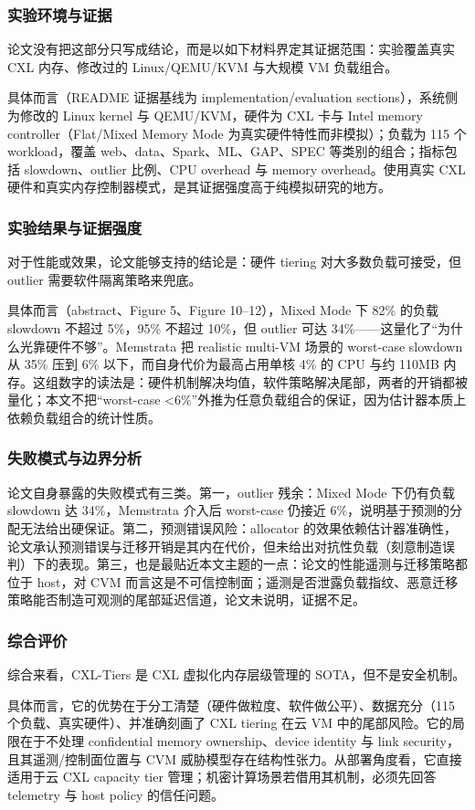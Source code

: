 \documentclass[11pt]{ctexart}
\begin{document}
\subsubsection{实验环境与证据}
论文没有把这部分只写成结论，而是以如下材料界定其证据范围：实验覆盖真实 CXL 内存、修改过的 Linux/QEMU/KVM 与大规模 VM 负载组合。\par
具体而言（README 证据基线为 implementation/evaluation sections），系统侧为修改的 Linux kernel 与 QEMU/KVM，硬件为 CXL 卡与 Intel memory controller（Flat/Mixed Memory Mode 为真实硬件特性而非模拟）；负载为 115 个 workload，覆盖 web、data、Spark、ML、GAP、SPEC 等类别的组合；指标包括 slowdown、outlier 比例、CPU overhead 与 memory overhead。使用真实 CXL 硬件和真实内存控制器模式，是其证据强度高于纯模拟研究的地方。\par
\subsubsection{实验结果与证据强度}
对于性能或效果，论文能够支持的结论是：硬件 tiering 对大多数负载可接受，但 outlier 需要软件隔离策略来兜底。\par
具体而言（abstract、Figure 5、Figure 10--12），Mixed Mode 下 82\% 的负载 slowdown 不超过 5\%，95\% 不超过 10\%，但 outlier 可达 34\%——这量化了“为什么光靠硬件不够”。Memstrata 把 realistic multi-VM 场景的 worst-case slowdown 从 35\% 压到 6\% 以下，而自身代价为最高占用单核 4\% 的 CPU 与约 110MB 内存。这组数字的读法是：硬件机制解决均值，软件策略解决尾部，两者的开销都被量化；本文不把“worst-case <6\%”外推为任意负载组合的保证，因为估计器本质上依赖负载组合的统计性质。\par
\subsubsection{失败模式与边界分析}
论文自身暴露的失败模式有三类。第一，outlier 残余：Mixed Mode 下仍有负载 slowdown 达 34\%，Memstrata 介入后 worst-case 仍接近 6\%，说明基于预测的分配无法给出硬保证。第二，预测错误风险：allocator 的效果依赖估计器准确性，论文承认预测错误与迁移开销是其内在代价，但未给出对抗性负载（刻意制造误判）下的表现。第三，也是最贴近本文主题的一点：论文的性能遥测与迁移策略都位于 host，对 CVM 而言这是不可信控制面；遥测是否泄露负载指纹、恶意迁移策略能否制造可观测的尾部延迟信道，论文未说明，证据不足。\par
\subsubsection{综合评价}
综合来看，CXL-Tiers 是 CXL 虚拟化内存层级管理的 SOTA，但不是安全机制。\par
具体而言，它的优势在于分工清楚（硬件做粒度、软件做公平）、数据充分（115 个负载、真实硬件）、并准确刻画了 CXL tiering 在云 VM 中的尾部风险。它的局限在于不处理 confidential memory ownership、device identity 与 link security，且其遥测/控制面位置与 CVM 威胁模型存在结构性张力。从部署角度看，它直接适用于云 CXL capacity tier 管理；机密计算场景若借用其机制，必须先回答 telemetry 与 host policy 的信任问题。\par
\end{document}
